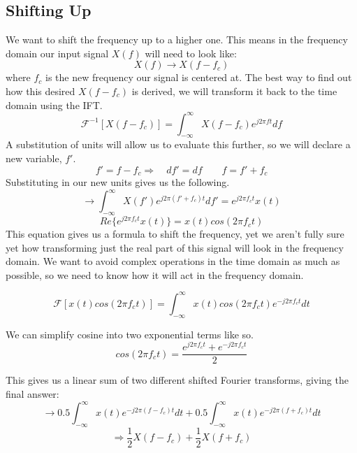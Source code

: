 \documentclass[12pt]{article}
\begin{document}
\subsection{Shifting Up}
We want to shift the frequency up to a higher one. This means in the frequency domain our input signal $X(f)$ will need to look like:
$$X(f) \rightarrow X(f-f_c) $$ where $f_c$ is the new frequency our signal is centered at. The best way to find out how this desired $X(f-f_c)$ is derived, we will transform it back to the time domain using the IFT.
$$\mathscr{F}^{-1} [X(f-f_c)]= \int_{-\infty}^{\infty} X(f-f_c)e^{j2\pi ft} df $$ 
A substitution of units will allow us to evaluate this further, so we will declare a new variable, $f'$. 
$$ f'=f-f_c \Rightarrow \quad df' = df \qquad f=f' +f_c $$
Substituting in our new units gives us the following.
$$\rightarrow \int_{-\infty}^{\infty} X(f')e^{j2\pi (f'+f_c)t}df' = e^{j2\pi f_c t} x(t) $$
$$Re\{ e^{j2\pi f_c t} x(t)\} = x(t)cos(2\pi f_c t) $$
This equation gives us a formula to shift the frequency, yet we aren't fully sure yet how transforming just the real part of this signal will look in the frequency domain. We want to avoid complex operations in the time domain as much as possible, so we need to know how it will act in the frequency domain.

$$\mathscr{F} [x(t)cos(2\pi f_c t)] = \int_{-\infty}^{\infty} x(t)cos(2\pi f_c t) e^{-j2\pi f_c t} dt $$

We can simplify cosine into two exponential terms like so.
$$cos(2\pi f_c t) = \frac{e^{j2\pi f_c t}+e^{-j2\pi f_c t}}{2} $$

This gives us a linear sum of two different shifted Fourier transforms, giving the final answer: 
$$\rightarrow 0.5\int_{-\infty}^{\infty} x(t) e^{-j2\pi (f-f_c) t} dt + 0.5\int_{-\infty}^{\infty} x(t) e^{-j2\pi (f+f_c) t} dt $$
$$\Rightarrow \frac{1}{2} X(f-f_c) + \frac{1}{2} X(f+f_c) $$
\end{document}
